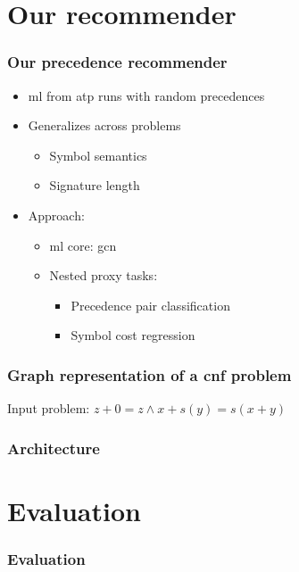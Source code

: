 \documentclass[a4paper]{beamer}
\begin{document}
\section{Our recommender}

\begin{frame}
\frametitle{Our precedence recommender}
\begin{itemize}
\item \Acrlong{ml} from \acrshort{atp} runs with random precedences
\item Generalizes across problems
\begin{itemize}
\item Symbol semantics
\item Signature length
\end{itemize}
\item Approach:
\begin{itemize}
\item \Acrshort{ml} core: \Gls{gcn}
\item Nested proxy tasks:
\begin{itemize}
\item Precedence pair classification
\item Symbol cost regression
\end{itemize}
\end{itemize}
\end{itemize}
\end{frame}

\begin{frame}
\frametitle{Graph representation of a \acrshort{cnf} problem}

Input problem: $z + 0 = z \land x + s(y) = s(x + y)$

\centering

\end{frame}

\begin{frame}
\frametitle{Architecture}
\centering

\end{frame}

\section{Evaluation}

\begin{frame}
\frametitle{Evaluation}

\fontsize{10pt}{12}\selectfont

\centering


\end{frame}
\end{document}

